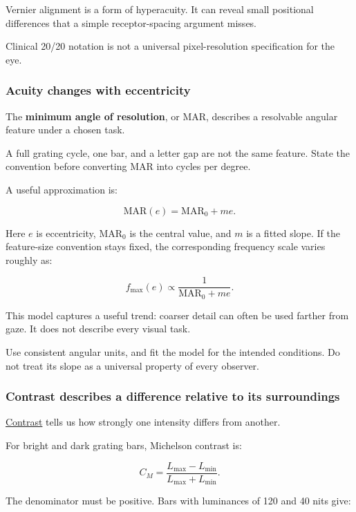 Vernier alignment is a form of hyperacuity. It can reveal small positional differences that a simple receptor-spacing argument misses.

Clinical 20/20 notation is not a universal pixel-resolution specification for the eye.

\subsubsection{Acuity changes with eccentricity}\label{04-visual-computing-ii-ch043-acuity-changes-with-eccentricity}

The \textbf{minimum angle of resolution}, or MAR, describes a resolvable angular feature under a chosen task.

A full grating cycle, one bar, and a letter gap are not the same feature. State the convention before converting MAR into cycles per degree.

A useful approximation is:

\[
\mathrm{MAR}(e)=\mathrm{MAR}_0+me.
\]

Here \(e\) is eccentricity, \(\mathrm{MAR}_0\) is the central value, and \(m\) is a fitted slope. If the feature-size convention stays fixed, the corresponding frequency scale varies roughly as:

\[
f_{\max}(e)\propto\frac1{\mathrm{MAR}_0+me}.
\]

This model captures a useful trend: coarser detail can often be used farther from gaze. It does not describe every visual task.

Use consistent angular units, and fit the model for the intended conditions. Do not treat its slope as a universal property of every observer.

\subsubsection{Contrast describes a difference relative to its surroundings}\label{04-visual-computing-ii-ch043-contrast-describes-a-difference-relative-to-its-surroundings}

\hyperref[appendix-b3aa9e8e01ad]{Contrast} tells us how strongly one intensity differs from another.

For bright and dark grating bars, Michelson contrast is:

\[
C_M=\frac{L_{\max}-L_{\min}}{L_{\max}+L_{\min}}.
\]

The denominator must be positive. Bars with luminances of 120 and 40 nits give:

